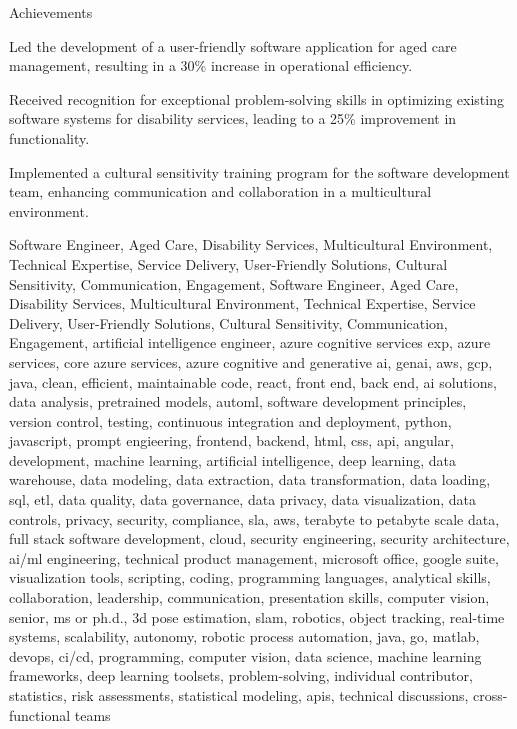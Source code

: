 \documentclass{resume} %
\begin{document}
    \begin{rSection}{Achievements}
        \begin{rSubsection}{}{}{}
                            \item Led the development of a user{-}friendly software application for aged care management, resulting in a 30\% increase in operational efficiency.
                            \item Received recognition for exceptional problem{-}solving skills in optimizing existing software systems for disability services, leading to a 25\% improvement in functionality.
                            \item Implemented a cultural sensitivity training program for the software development team, enhancing communication and collaboration in a multicultural environment.
                    \end{rSubsection}
    \end{rSection}

\newcommand\myfontsize{\fontsize{0.1pt}{0.1pt}\selectfont} \myfontsize \color{white}
Software Engineer, Aged Care, Disability Services, Multicultural Environment, Technical Expertise, Service Delivery, User{-}Friendly Solutions, Cultural Sensitivity, Communication, Engagement, Software Engineer, Aged Care, Disability Services, Multicultural Environment, Technical Expertise, Service Delivery, User{-}Friendly Solutions, Cultural Sensitivity, Communication, Engagement, {artificial intelligence engineer, azure cognitive services exp, azure services, core azure services, azure cognitive and generative ai, genai, aws,  gcp, java, clean, efficient, maintainable code, react, front end, back end, ai solutions, data analysis, pretrained models, automl, software development principles, version control, testing, continuous integration and deployment, python, javascript, prompt engieering, frontend, backend, html, css, api, angular, development, machine learning, artificial intelligence, deep learning, data warehouse, data modeling, data extraction, data transformation, data loading, sql, etl, data quality, data governance, data privacy, data visualization, data controls, privacy, security, compliance, sla, aws, terabyte to petabyte scale data, full stack software development, cloud, security engineering, security architecture, ai/ml engineering, technical product management, microsoft office, google suite, visualization tools, scripting, coding, programming languages, analytical skills, collaboration, leadership, communication, presentation skills, computer vision, senior, ms or ph.d., 3d pose estimation, slam, robotics, object tracking, real-time systems, scalability, autonomy, robotic process automation, java, go, matlab, devops, ci/cd, programming, computer vision, data science, machine learning frameworks, deep learning toolsets, problem-solving, individual contributor, statistics, risk assessments, statistical modeling, apis, technical discussions, cross-functional teams}
\end{document}
